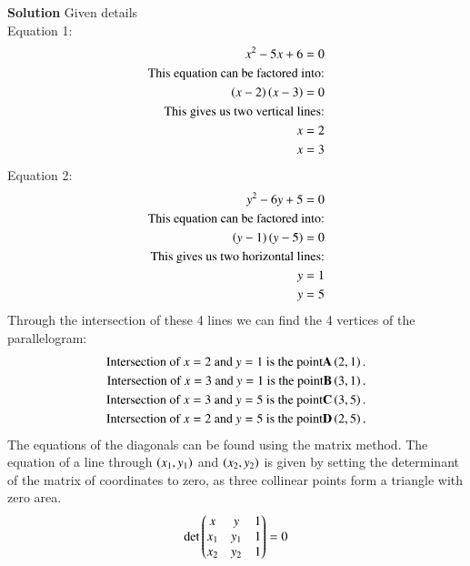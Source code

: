 \documentclass[journal]{IEEEtran}
\theoremstyle{remark}
\begin{document}
\textbf{Solution} Given details\\
Equation 1:
\begin{align}
    x^2-5x+6=0 \\
    \text{This equation can be factored into:} \\
    \left(x-2\right)\left(x-3\right)=0 \\
    \text{This gives us two vertical lines:} \\
    x=2 \\
    x=3
\end{align}
Equation 2:
\begin{align}
    y^2-6y+5=0 \\
    \text{This equation can be factored into:} \\
    \left(y-1\right)\left(y-5\right)=0 \\
    \text{This gives us two horizontal lines:} \\
    y=1 \\
    y=5
\end{align}
Through the intersection of these 4 lines we can find the 4 vertices of the parallelogram:
\begin{align}
    \text{Intersection of } x=2 \text{ and } y=1 \text{ is the point} \mathbf{A}\left(2,1\right). \\
    \text{Intersection of } x=3 \text{ and } y=1 \text{ is the point} \mathbf{B}\left(3,1\right). \\
    \text{Intersection of } x=3 \text{ and } y=5 \text{ is the point} \mathbf{C}\left(3,5\right). \\
    \text{Intersection of } x=2 \text{ and } y=5 \text{ is the point} \mathbf{D}\left(2,5\right).
\end{align}
The equations of the diagonals can be found using the matrix method. The equation of a line through $\left(x_1, y_1\right)$ and $\left(x_2, y_2\right)$ is given by setting the determinant of the matrix of coordinates to zero, as three collinear points form a triangle with zero area.
\begin{align*}
    \det \begin{pmatrix} x & y & 1 \\ x_1 & y_1 & 1 \\ x_2 & y_2 & 1 \end{pmatrix} = 0
\end{align*}
\end{document}
